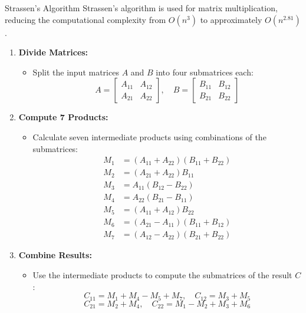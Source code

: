 \begin{usage}[]{Strassen's Algorithm}
    Strassen's algorithm is used for matrix multiplication, reducing the computational complexity from \(O(n^3)\) to approximately \(O(n^{2.81})\).

    \begin{enumerate}
        \item \textbf{Divide Matrices:}
              \begin{itemize}
                  \item Split the input matrices \(A\) and \(B\) into four submatrices each:
                        \[
                            A = \begin{bmatrix} A_{11} & A_{12} \\ A_{21} & A_{22} \end{bmatrix}, \quad
                            B = \begin{bmatrix} B_{11} & B_{12} \\ B_{21} & B_{22} \end{bmatrix}
                        \]
              \end{itemize}

        \item \textbf{Compute 7 Products:}
              \begin{itemize}
                  \item Calculate seven intermediate products using combinations of the submatrices:
                        \begin{align*}
                            M_1 & = (A_{11} + A_{22})(B_{11} + B_{22}) \\
                            M_2 & = (A_{21} + A_{22})B_{11}            \\
                            M_3 & = A_{11}(B_{12} - B_{22})            \\
                            M_4 & = A_{22}(B_{21} - B_{11})            \\
                            M_5 & = (A_{11} + A_{12})B_{22}            \\
                            M_6 & = (A_{21} - A_{11})(B_{11} + B_{12}) \\
                            M_7 & = (A_{12} - A_{22})(B_{21} + B_{22})
                        \end{align*}
              \end{itemize}

        \item \textbf{Combine Results:}
              \begin{itemize}
                  \item Use the intermediate products to compute the submatrices of the result \(C\):
                        \[
                            C_{11} = M_1 + M_4 - M_5 + M_7, \quad
                            C_{12} = M_3 + M_5
                        \]
                        \[
                            C_{21} = M_2 + M_4, \quad
                            C_{22} = M_1 - M_2 + M_3 + M_6
                        \]
              \end{itemize}


\end{enumerate}
\end{usage}
